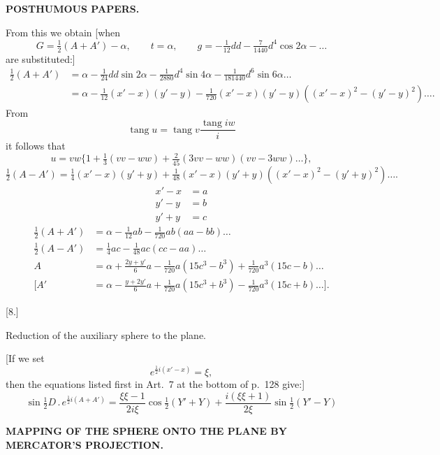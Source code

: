 \par\clearpage
\noindent{}\hfill{\small\textbf{POSTHUMOUS PAPERS.}}\hfill\null\par\medskip

From this we obtain [when
\[
G=\tfrac12(A+A')-\alpha,\qquad t=\alpha,\qquad
g=-\tfrac1{12}dd-\tfrac7{1440}d^4\cos2\alpha-\ldots
\]
\noindent are substituted:]
\[
\begin{aligned}
\tfrac12(A+A')&=\alpha-\tfrac1{24}dd\sin2\alpha-\tfrac1{2880}d^4\sin4\alpha
 -\tfrac1{181440}d^6\sin6\alpha\ldots\\
 &=\alpha-\tfrac1{12}(x'-x)(y'-y)
 -\tfrac1{720}(x'-x)(y'-y)((x'-x)^2-(y'-y)^2)\ldots.
\end{aligned}
\]
From
\[
\operatorname{tang}u=\operatorname{tang}v\frac{\operatorname{tang}iw}{i}
\]
\noindent it follows that
\[
u=vw\{1+\tfrac13(vv-ww)+\tfrac2{45}(3vv-ww)(vv-3ww)\ldots\},
\]
\noindent [hence for \(u=\tfrac12(A-A')\), \(v=\tfrac12(x'-x)\),
\(w=\tfrac12(y'+y)\), we obtain:]
\[
\tfrac12(A-A')=\tfrac14(x'-x)(y'+y)
 +\tfrac1{48}(x'-x)(y'+y)((x'-x)^2-(y'+y)^2)\ldots.
\]
\noindent [If we set]
\[
\begin{aligned}
x'-x&=a\\
y'-y&=b\\
y'+y&=c
\end{aligned}
\]
\[
\begin{aligned}
\tfrac12(A+A')&=\alpha-\tfrac1{12}ab-\tfrac1{720}ab(aa-bb)\ldots\\
\tfrac12(A-A')&=\tfrac14ac-\tfrac1{48}ac(cc-aa)\ldots\\
A&=\alpha+\frac{2y+y'}6a-\tfrac1{720}a(15c^3-b^3)+\tfrac1{720}a^3(15c-b)\ldots\\
\mathopen{[}A'&=\alpha-\frac{y+2y'}6a+\tfrac1{720}a(15c^3+b^3)
 -\tfrac1{720}a^3(15c+b)\ldots\mathclose{]}.
\end{aligned}
\]

\begin{center}
[8.]\par\medskip
Reduction of the auxiliary sphere to the plane.
\end{center}
[If we set
\[
e^{\frac12i(x'-x)}=\xi,
\]
\noindent then the equations listed first in Art.\ 7 at the bottom of p.\ 128 give:]
\[
\sin\tfrac12D\,.\,e^{\frac12i(A+A')}
 =\frac{\xi\xi-1}{2i\xi}\cos\tfrac12(Y'+Y)
 +\frac{i(\xi\xi+1)}{2\xi}\sin\tfrac12(Y'-Y)
\]

\par\clearpage
\noindent\null\hfill{\fontsize{8}{10}\selectfont\textbf{MAPPING OF THE SPHERE ONTO THE PLANE BY MERCATOR'S PROJECTION.}}\hfill{}\par\medskip

